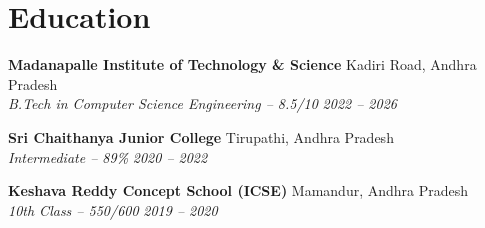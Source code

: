 \documentclass[letterpaper,10pt]{article}
\begin{document}
\section{Education}
\begin{resumelist}
  \item \textbf{Madanapalle Institute of Technology \& Science} \hfill Kadiri Road, Andhra Pradesh \\
  \textit{B.Tech in Computer Science Engineering -- 8.5/10} \hfill \textit{2022 -- 2026}
  
  \item \textbf{Sri Chaithanya Junior College} \hfill Tirupathi, Andhra Pradesh \\
  \textit{Intermediate -- 89\%} \hfill \textit{2020 -- 2022}
  
  \item \textbf{Keshava Reddy Concept School (ICSE)} \hfill Mamandur, Andhra Pradesh \\
  \textit{10th Class -- 550/600} \hfill \textit{2019 -- 2020}
\end{resumelist}
\end{document}

